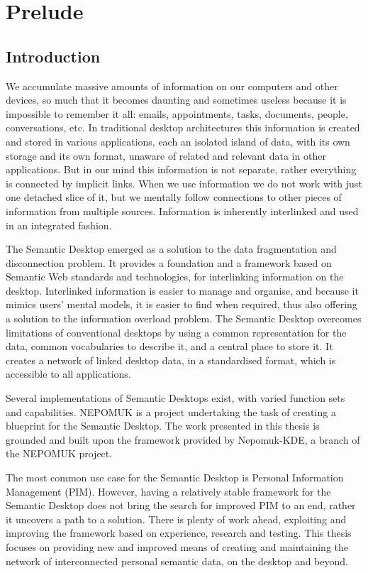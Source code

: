 \part{Prelude}
\label{part:prelude}

\chapter{Introduction}
\label{ch:introduction}

We accumulate massive amounts of information on our computers and other devices, so much that it becomes daunting and sometimes useless because it is impossible to remember it all: emails, appointments, tasks, documents, people, conversations, etc. In traditional desktop architectures this information is created and stored in various applications, each an isolated island of data, with its own storage and its own format, unaware of related and relevant data in other applications. But in our mind this information is not separate, rather everything is connected by implicit links. When we use information we do not work with just one detached slice of it, but we mentally follow connections to other pieces of information from multiple sources. Information is inherently interlinked and used in an integrated fashion.

The Semantic Desktop emerged as a solution to the data fragmentation and disconnection problem. It provides a foundation and a framework based on Semantic Web standards and technologies, for interlinking information on the desktop. Interlinked information is easier to manage and organise, and because it mimics users' mental models, it is easier to find when required, thus also offering a solution to the information overload problem. The Semantic Desktop overcomes limitations of conventional desktops by using a common representation for the data, common vocabularies to describe it, and a central place to store it. It creates a network of linked desktop data, in a standardised format, which is accessible to all applications.

Several implementations of Semantic Desktops exist, with varied function sets and capabilities. NEPOMUK is a project undertaking the task of creating a blueprint for the Semantic Desktop. 
The work presented in this thesis is grounded and built upon the framework provided by Nepomuk-KDE, a branch of the NEPOMUK project. 

The most common use case for the Semantic Desktop is Personal Information Management (PIM). However, having a relatively stable framework for the Semantic Desktop does not bring the search for improved PIM to an end, rather it uncovers a path to a solution. There is plenty of work ahead, exploiting and improving the framework based on experience, research and testing. This thesis focuses on providing new and improved means of creating and maintaining the network of interconnected personal semantic data, on the desktop and beyond.






